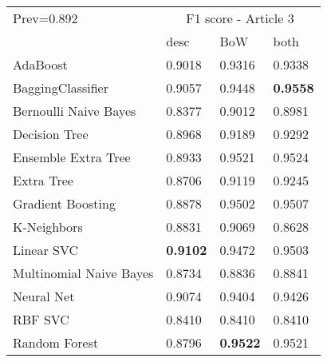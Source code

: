 \begin{tabular}{|l|l|l|l| }
\hline
Prev=0.892 &  \multicolumn{3}{c|}{F1 score - Article 3} \\
\cline{2-4} & desc & BoW & both \\ \hline
AdaBoost                & 0.9018 & 0.9316 & 0.9338\\
BaggingClassifier       & 0.9057 & 0.9448 & {\bf 0.9558}\\
Bernoulli Naive Bayes   & 0.8377 & 0.9012 & 0.8981\\
Decision Tree           & 0.8968 & 0.9189 & 0.9292\\
Ensemble Extra Tree     & 0.8933 & 0.9521 & 0.9524\\
Extra Tree              & 0.8706 & 0.9119 & 0.9245\\
Gradient Boosting       & 0.8878 & 0.9502 & 0.9507\\
K-Neighbors             & 0.8831 & 0.9069 & 0.8628\\
Linear SVC              & {\bf 0.9102} & 0.9472 & 0.9503\\
Multinomial Naive Bayes & 0.8734 & 0.8836 & 0.8841\\
Neural Net              & 0.9074 & 0.9404 & 0.9426\\
RBF SVC                 & 0.8410 & 0.8410 & 0.8410\\
Random Forest           & 0.8796 & {\bf 0.9522} & 0.9521\\
\hline
\end{tabular}